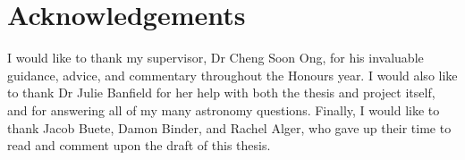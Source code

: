 
\chapter*{Acknowledgements}
\label{cha:ack}

    I would like to thank my supervisor, Dr Cheng Soon Ong, for his invaluable
    guidance, advice, and commentary throughout the Honours year. I would also
    like to thank Dr Julie Banfield for her help with both the thesis and
    project itself, and for answering all of my many astronomy questions.
    Finally, I would like to thank Jacob Buete, Damon Binder, and Rachel Alger,
    who gave up their time to read and comment upon the draft of this thesis.

